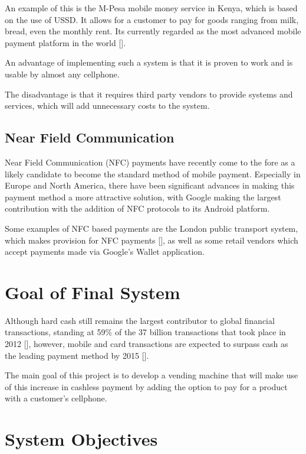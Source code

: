 An example of this is the M-Pesa mobile money service in Kenya, which is based on the use of
USSD. It allows for a customer to pay for goods ranging from milk, bread, even the monthly
rent. Its currently regarded as the most advanced mobile payment platform in the world
[\cite{website:m-pesa}]. 

An advantage of implementing such a system is that it is proven to work and is usable by almost
any cellphone.

The disadvantage is that it requires third party vendors to provide systems and services, which
will add unnecessary costs to the system.

\subsection{Near Field Communication}

Near Field Communication (NFC) payments have recently come to the fore as a likely candidate to
become the standard method of mobile payment. Especially in Europe and North America, there
have been significant advances in making this payment method a more attractive solution, with
Google making the largest contribution with the addition of NFC protocols to its Android
platform.

Some examples of NFC based payments are the London public transport system, which makes
provision for NFC payments [\cite{website:nfc-underground}], as well as some retail vendors
which accept payments made via Google's Wallet application.

\section{Goal of Final System}

Although hard cash still remains the largest contributor to global financial transactions,
standing at 59\% of the 37 billion transactions that took place in 2012 [\cite{website:money-transactions}], however,
mobile and card transactions are expected to surpass cash as the leading payment method by 2015
[\cite{website:money-transactions}]. 

The main goal of this project is to develop a vending machine that will make use of this
increase in cashless payment by adding the option to pay for a product with a customer's
cellphone. 

\section{System Objectives}

